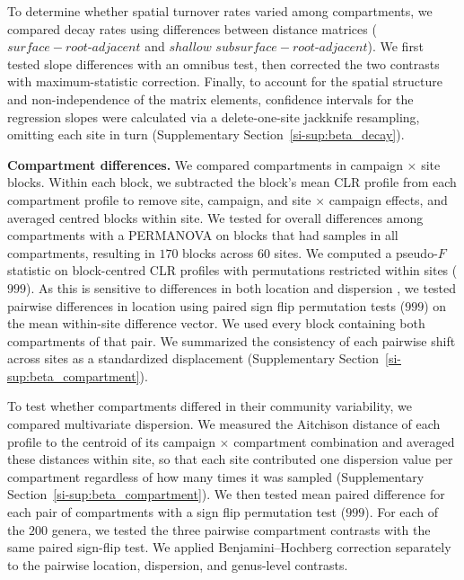 \documentclass[fleqn,10pt,numbers]{olplainarticle}
\begin{document}
To determine whether spatial turnover rates varied among compartments, we compared decay rates using differences between distance matrices ($surface-root\text{-}adjacent$ and $shallow$ $subsurface-root\text{-}adjacent$). We first tested slope differences with an omnibus test, then corrected the two contrasts with maximum-statistic correction. Finally, to account for the spatial structure and non-independence of the matrix elements, confidence intervals for the regression slopes were calculated via a delete-one-site jackknife resampling, omitting each site in turn (Supplementary Section~\ref{si-sup:beta_decay}).


\textbf{Compartment differences.} We compared compartments in campaign $\times$ site blocks. Within each block, we subtracted the block's mean CLR profile from each compartment profile to remove site, campaign, and site $\times$ campaign effects, and averaged centred blocks within site. We tested for overall differences among compartments with a PERMANOVA on blocks that had samples in all compartments, resulting in $170$ blocks across $60$ sites. We computed a pseudo-$F$ statistic \cite{anderson2001new} on block-centred CLR profiles with permutations restricted within sites ($999$). As this is sensitive to differences in both location and dispersion \cite{anderson2006multivariate}, we tested pairwise differences in location using paired sign flip permutation tests ($999$) on the mean within-site difference vector. We used every block containing both compartments of that pair. We summarized the consistency of each pairwise shift across sites as a standardized displacement (Supplementary Section~\ref{si-sup:beta_compartment}).

To test whether compartments differed in their community variability, we compared multivariate dispersion. We measured the Aitchison distance of each profile to the centroid of its campaign $\times$ compartment combination and averaged these distances within site, so that each site contributed one dispersion value per compartment regardless of how many times it was sampled (Supplementary Section~\ref{si-sup:beta_compartment}). We then tested mean paired difference for each pair of compartments with a sign flip permutation test ($999$). For each of the $200$ genera, we tested the three pairwise compartment contrasts with the same paired sign-flip test. We applied Benjamini--Hochberg correction separately to the pairwise location, dispersion, and genus-level contrasts.
\end{document}
